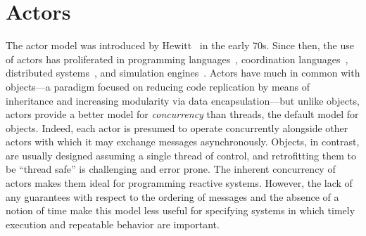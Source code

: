 \documentclass[sigconf]{acmart}
\newcommand{\ag}[1]{\mynote{Andr\'es}{#1}{asparagus}}%
\begin{document}
\section{Actors}\label{sec:actor}
The actor model was introduced by Hewitt~\cite{DBLP:conf/ijcai/HewittBS73} in the early 70s. 
Since then,
the use of actors has proliferated in programming languages~\cite{Armstrong:96:Erlang,desai2013p}, coordination languages~\cite{ren1995rtsynchronizer,ARC}, distributed systems~\cite{Hunt2018, DBLP:journals/corr/abs-1712-05889}, 
and simulation engines~\cite{Ptolemy:14:Book,DBLP:journals/fuin/SirjaniMSB04}. 
Actors have much in common with objects---a paradigm focused on reducing code replication by means of inheritance and increasing modularity via data encapsulation---but unlike objects, actors provide a better model for \emph{concurrency} than threads, the default model for objects.
Indeed, each actor is presumed to operate concurrently alongside other actors with which it may exchange messages asynchronously. 
Objects, in contrast, are usually designed assuming a single thread of control, and retrofitting them to be ``thread safe'' is challenging and error prone.
The inherent concurrency of actors makes them ideal for programming reactive systems.
However, the lack of any guarantees with respect to the ordering of messages and the absence of a notion of time make this 
model less useful for specifying systems in which timely execution and repeatable behavior are important.
\end{document}
